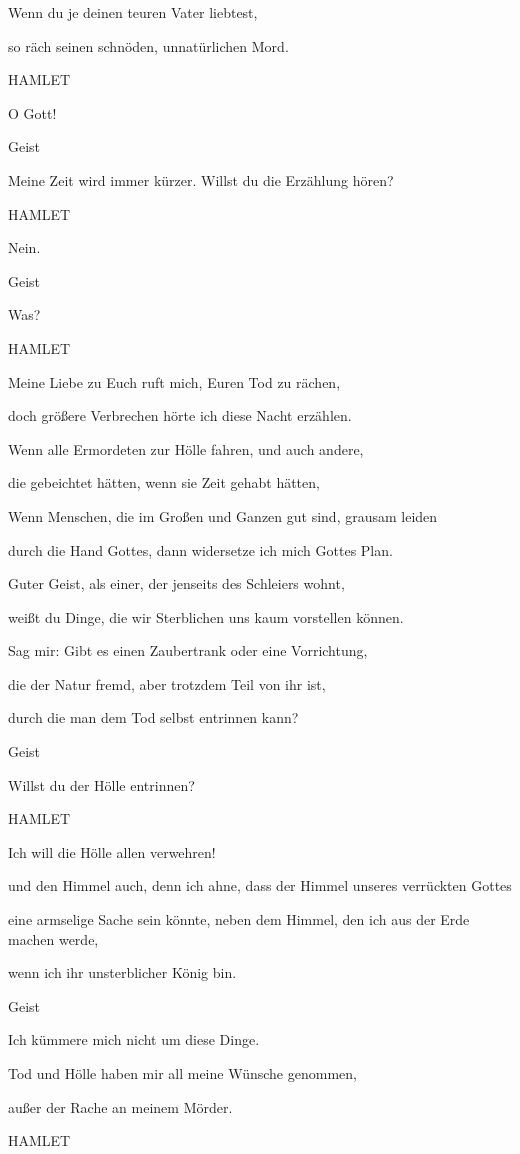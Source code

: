 {Wenn du je deinen teuren Vater liebtest,

so räch seinen schnöden, unnatürlichen Mord.

HAMLET

O Gott!

Geist

Meine Zeit wird immer kürzer. Willst du die Erzählung hören?

HAMLET

Nein.

Geist

Was?

HAMLET

Meine Liebe zu Euch ruft mich, Euren Tod zu rächen,

doch größere Verbrechen hörte ich diese Nacht erzählen.

Wenn alle Ermordeten zur Hölle fahren, und auch andere,

die gebeichtet hätten, wenn sie Zeit gehabt hätten,

Wenn Menschen, die im Großen und Ganzen gut sind, grausam leiden

durch die Hand Gottes, dann widersetze ich mich Gottes Plan.

Guter Geist, als einer, der jenseits des Schleiers wohnt,

weißt du Dinge, die wir Sterblichen uns kaum vorstellen können.

Sag mir: Gibt es einen Zaubertrank oder eine Vorrichtung,

die der Natur fremd, aber trotzdem Teil von ihr ist,

durch die man dem Tod selbst entrinnen kann?

Geist

Willst du der Hölle entrinnen?

HAMLET

Ich will die Hölle allen verwehren!

und den Himmel auch, denn ich ahne, dass der Himmel unseres verrückten Gottes

eine armselige Sache sein könnte, neben dem Himmel, den ich aus der Erde machen werde,

wenn ich ihr unsterblicher König bin.

Geist

Ich kümmere mich nicht um diese Dinge.

Tod und Hölle haben mir all meine Wünsche genommen,

außer der Rache an meinem Mörder.

HAMLET

}
